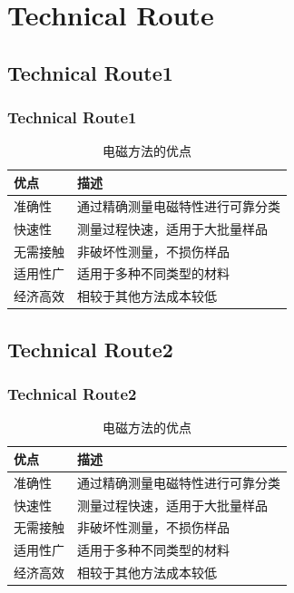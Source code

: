 \documentclass{beamer}
\begin{document}
{\begin{frame}
    
\end{frame}
\section{Technical Route}
\subsection{Technical Route1}
\begin{frame}
  \frametitle{Technical Route1}

\begin{table}[h]
        \centering
        \begin{tabular}{|l|l|}
          \hline
          \textbf{优点} & \textbf{描述} \\
          \hline
          准确性 & 通过精确测量电磁特性进行可靠分类 \\
          \hline
          快速性 & 测量过程快速，适用于大批量样品 \\
          \hline
          无需接触 & 非破坏性测量，不损伤样品 \\
          \hline
          适用性广 & 适用于多种不同类型的材料 \\
          \hline
          经济高效 & 相较于其他方法成本较低 \\
          \hline
        \end{tabular}
        \caption{电磁方法的优点}
      \end{table}
\end{frame}
\subsection{Technical Route2}
\begin{frame}
 \frametitle{Technical Route2}

\begin{table}[h]
        \centering
        \begin{tabular}{|l|l|}
          \hline
          \textbf{优点} & \textbf{描述} \\
          \hline
          准确性 & 通过精确测量电磁特性进行可靠分类 \\
          \hline
          快速性 & 测量过程快速，适用于大批量样品 \\
          \hline
          无需接触 & 非破坏性测量，不损伤样品 \\
          \hline
          适用性广 & 适用于多种不同类型的材料 \\
          \hline
          经济高效 & 相较于其他方法成本较低 \\
          \hline
        \end{tabular}
        \caption{电磁方法的优点}
      \end{table}


\end{frame}}
\end{document}
